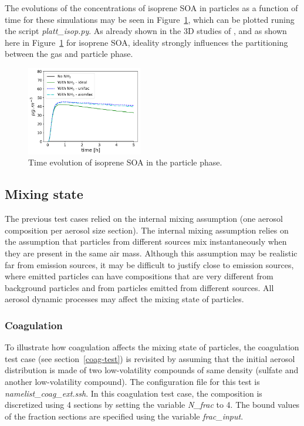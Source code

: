 \documentclass[a4paper,11pt]{article}
\begin{document}
{{The evolutions of the concentrations of isoprene SOA in particles as a function of time for these simulations may be seen in Figure~\ref{fig-platt-isop}, which can be plotted runing the script {\it{platt\_isop.py}}.
As already shown in the 3D studies of \cite{couvidat2012, kim2019}, and as shown here in Figure~\ref{fig-platt-isop} for isoprene SOA, ideality strongly influences the partitioning between the gas and particle phase. 
\begin{figure}[H]
        \begin{center}
                \includegraphics[angle=0,width=0.45\textwidth]{../graph/figure_ref/platt-isop.png}
        \end{center}
	\caption{Time evolution of isoprene SOA in the particle phase.}
\label{fig-platt-isop}
\end{figure}
      

\subsection{Mixing state}
The previous test cases relied on the internal mixing assumption (one aerosol
composition per aerosol size section).
The internal mixing assumption relies on the assumption that particles from different sources
mix instantaneously when they are present in the same air mass. Although this assumption may
be realistic far from emission sources, it may be difficult to justify close to emission sources,
where emitted particles can have compositions that are very different from background particles
and from particles emitted from different sources.
All aerosol dynamic processes may affect the mixing state of particles.

\subsubsection{Coagulation}

To illustrate how coagulation affects the mixing state of particles, the
coagulation test case (see section~\ref{coag-test}) is revisited by assuming
that the initial aerosol distribution is made of two low-volatility compounds
of same density (sulfate and another low-volatility compound).
The configuration file for this test is {\it{namelist\_coag\_ext.ssh}}.
In this coagulation test case, the composition is discretized using 4 sections
by setting the variable {\it{N\_frac}} to 4. The bound values of the fraction
sections are specified using the variable {\it{frac\_input}}.

}}
\end{document}
